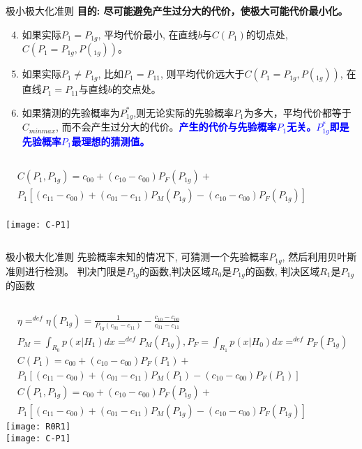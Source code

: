 \begin{frame}[shrink]{极小极大化准则}
\textbf{目的: 尽可能避免产生过分大的代价，使极大可能代价最小化。}
\begin{enumerate}
\setcounter{enumi}{3}
\item 如果实际$P_1=P_{1g}$, 平均代价最小, 在直线$b$与$C(P_1)$的切点处, $C(P_1=P_{1g},P(_{1g}))$。
\item 如果实际$P_1\ne P_{1g}$, 比如$P_1=P_{11}$, 则平均代价远大于$C(P_1=P_{1g},P(_{1g}))$, 在直线$P_1=P_{11}$与直线$b$的交点处。
\item 如果猜测的先验概率为$P_{1g}^{\ast}$,则无论实际的先验概率$P_1$为多大，平均代价都等于$C_{minmax}$, 而不会产生过分大的代价。\textbf{\textcolor{blue}{产生的代价与先验概率$P_1$无关。$P_{1g}^{\ast}$即是先验概率$P_1$最理想的猜测值。}}
\end{enumerate}
\begin{columns}
\begin{align*}
&C(P_1,P_{1g})=c_{00}+(c_{10}-c_{00})P_F(P_{1g})+\\
&P_1[(c_{11}-c_{00})+(c_{01}-c_{11})P_M(P_{1g})-(c_{10}-c_{00})P_F(P_{1g})]
\end{align*}
~\\
\centering
\texttt{[image: C-P1]}
\end{columns}
\end{frame}

\begin{frame}[shrink]{极小极大化准则}
先验概率未知的情况下, 可猜测一个先验概率$P_{1g}$, 然后利用贝叶斯准则进行检测。
判决门限是$P_{1g}$的函数,判决区域$R_0$是$P_{1g}$的函数, 判决区域$R_1$是$P_{1g}$的函数
\begin{columns}
	\begin{align*}
	&\eta\mathop{=}^{def}\eta(P_{1g})=\frac{1}{P_{1g}(c_{01}-c_{11})}-\frac{c_{10}-c_{00}}{c_{01}-c_{11}}\\
	&P_M=\int_{R_0}p(x|H_1)dx\mathop{=}^{def}P_M(P_{1g}), P_F=\int_{R_1}p(x|H_0)dx\mathop{=}^{def}P_F(P_{1g})\\
	&C(P_1)=c_{00}+(c_{10}-c_{00})P_F(P_1)+\\
	&P_1[(c_{11}-c_{00})+(c_{01}-c_{11})P_M(P_1)-(c_{10}-c_{00})P_F(P_1)]\\
	&C(P_1,P_{1g})=c_{00}+(c_{10}-c_{00})P_F(P_{1g})+\\
	&P_1[(c_{11}-c_{00})+(c_{01}-c_{11})P_M(P_{1g})-(c_{10}-c_{00})P_F(P_{1g})]
	\end{align*}
	\centering
	\texttt{[image: R0R1]}\\
	\texttt{[image: C-P1]}
\end{columns}
\end{frame}

